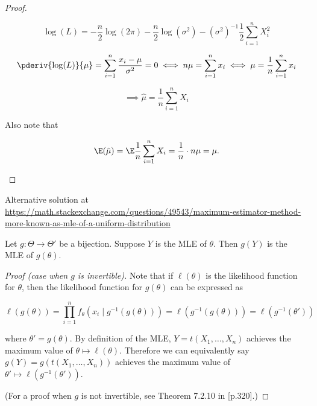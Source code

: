 \begin{proof}
\begin{enumerate}[a.]
\[
\log(L) = -\frac{n}{2} \log(2 \pi) - \frac{n}{2} \log(\sigma^2) - (\sigma^2)^{-1} \frac{1}{2} \sum_{i=1}^n X_i^2
\]

\[
\pderiv{\log(L)}{\mu} = \sum_{i=1}^n \frac{x_i - \mu}{\sigma^2} = 0 \iff n \mu = \sum_{i=1}^n x_i \iff \mu = \frac{1}{n}  \sum_{i=1}^n x_i 
\]


\[
\implies \hat{\mu} = \frac{1}{n} \sum_{i=1}^n X_i
\]

Also note that 

\[
\E( \hat{\mu}) = \E  \frac{1}{n} \sum_{i=1}^n X_i = \frac{1}{n} \cdot n \mu = \mu.
\]

\end{enumerate}

\end{proof}

\begin{example} Alternative solution at \url{https://math.stackexchange.com/questions/49543/maximum-estimator-method-more-known-as-mle-of-a-uniform-distribution}

\end{example}

\begin{proposition}\label{mathstats.prop.inv.mle}Let \(g:\Theta \to \Theta'\) be a bijection. Suppose \(Y\) is the MLE of \(\theta\). Then \(g(Y)\) is the MLE of \(g(\theta)\).

\end{proposition}

\begin{proof}[Proof (case when \(g\) is invertible)]Note that if \(\ell(\theta)\) is the likelihood function for \(\theta\), then the likelihood function for \(g(\theta)\) can be expressed as 

\[
\ell(g(\theta)) = \prod_{i=1}^n f_\theta(x_i \mid g^{-1}(g(\theta))) = \ell(g^{-1}(g(\theta))) = \ell(g^{-1}(\theta'))
\]

where \(\theta' = g(\theta)\). By definition of the MLE, \(Y = t(X_1, \ldots, X_n)\) achieves the maximum value of \(\theta \mapsto \ell(\theta)\). Therefore we can equivalently say \(g(Y) = g(t(X_1, \ldots, X_n))\) achieves the maximum value of \(\theta' \mapsto \ell(g^{-1}(\theta'))\).

(For a proof when \(g\) is not invertible, see Theorem 7.2.10 in \citet{CaseBerg:01}[p.320].)

\end{proof}

